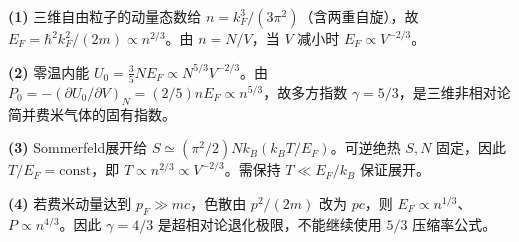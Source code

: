 \par\noindent\textbf{(1)} 三维自由粒子的动量态数给 \(n=k_F^3/(3\pi^2)\)（含两重自旋），故 \(E_F=\hbar^2k_F^2/(2m)\propto n^{2/3}\)。由 \(n=N/V\)，当 \(V\) 减小时 \(E_F\propto V^{-2/3}\)。
\par\noindent\textbf{(2)} 零温内能 \(U_0=\tfrac35NE_F\propto N^{5/3}V^{-2/3}\)。由 \(P_0=-(\partial U_0/\partial V)_N=(2/5)nE_F\propto n^{5/3}\)，故多方指数 \(\gamma=5/3\)，是三维非相对论简并费米气体的固有指数。
\par\noindent\textbf{(3)} Sommerfeld展开给 \(S\simeq(\pi^2/2)Nk_B(k_BT/E_F)\)。可逆绝热 \(S,N\) 固定，因此 \(T/E_F=\mathrm{const}\)，即 \(T\propto n^{2/3}\propto V^{-2/3}\)。需保持 \(T\ll E_F/k_B\) 保证展开。
\par\noindent\textbf{(4)} 若费米动量达到 \(p_F\gg mc\)，色散由 \(p^2/(2m)\) 改为 \(pc\)，则 \(E_F\propto n^{1/3}\)、\(P\propto n^{4/3}\)。因此 \(\gamma=4/3\) 是超相对论退化极限，不能继续使用 \(5/3\) 压缩率公式。
